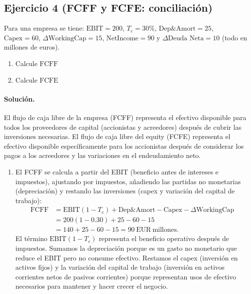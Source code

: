 \documentclass[12pt,a4paper]{article}
\newcommand{\EUR}[1]{\ensuremath{#1~\text{EUR}}}
\newenvironment{ejercicio}[1]{\subsection*{Ejercicio #1}}{}
\newenvironment{solucion}{\paragraph{Solución.}}{}
\begin{document}
\begin{ejercicio}{4 (FCFF y FCFE: conciliación)}
Para una empresa se tiene: $\text{EBIT}=200$, $T_c=30\%$, $\text{Dep\&Amort}=25$, $\text{Capex}=60$, $\Delta\text{WorkingCap}=15$, $\text{NetIncome}=90$ y $\Delta\text{Deuda Neta}=10$ (todo en millones de euros).
\begin{enumerate}[label=\alph*)]
  \item Calcule $\text{FCFF}$
  \item Calcule $\text{FCFE}$
\end{enumerate}
\end{ejercicio}
\begin{solucion}
El flujo de caja libre de la empresa (FCFF) representa el efectivo disponible para todos los proveedores de capital (accionistas y acreedores) después de cubrir las inversiones necesarias. El flujo de caja libre del equity (FCFE) representa el efectivo disponible específicamente para los accionistas después de considerar los pagos a los acreedores y las variaciones en el endeudamiento neto.

\begin{enumerate}[label=\alph*)]
  \item El FCFF se calcula a partir del EBIT (beneficio antes de intereses e impuestos), ajustando por impuestos, añadiendo las partidas no monetarias (depreciación) y restando las inversiones (capex y variación del capital de trabajo):
  \begin{align*}
  \text{FCFF} &= \text{EBIT}(1-T_c) + \text{Dep\&Amort} - \text{Capex} - \Delta\text{WorkingCap}\\
              &= 200(1-0.30) + 25 - 60 - 15\\
              &= 140 + 25 - 60 - 15 = \EUR{90}~\text{millones}.
  \end{align*}
  El término $\text{EBIT}(1-T_c)$ representa el beneficio operativo después de impuestos. Sumamos la depreciación porque es un gasto no monetario que reduce el EBIT pero no consume efectivo. Restamos el capex (inversión en activos fijos) y la variación del capital de trabajo (inversión en activos corrientes netos de pasivos corrientes) porque representan usos de efectivo necesarios para mantener y hacer crecer el negocio.
  

\end{enumerate}
\end{solucion}
\end{document}

